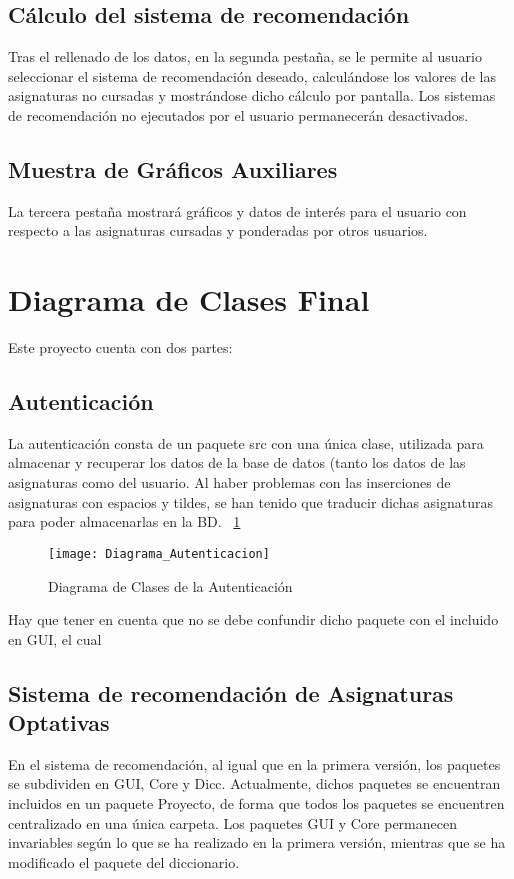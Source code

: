 \subsection{Cálculo del sistema de recomendación}
Tras el rellenado de los datos, en la segunda pestaña, se le permite al usuario seleccionar el sistema de recomendación deseado, calculándose los valores de las asignaturas no cursadas y mostrándose dicho cálculo por pantalla. Los sistemas de recomendación no ejecutados por el usuario permanecerán desactivados. 
\subsection{Muestra de Gráficos Auxiliares}
La tercera pestaña mostrará gráficos y datos de interés para el usuario con respecto a las asignaturas cursadas y ponderadas por otros usuarios. 


\section{Diagrama de Clases Final}
Este proyecto cuenta con dos partes: 
\subsection{Autenticación}
La autenticación consta de un paquete src con una única clase, utilizada para almacenar y recuperar los datos de la base de datos (tanto los datos de las asignaturas como del usuario. 
Al haber problemas con las inserciones de asignaturas con espacios y tildes, se han tenido que traducir dichas asignaturas para poder almacenarlas en la BD. ~\ref{fig:C.4.1}
\begin{figure}[h]
\centering
\texttt{[image: Diagrama\_Autenticacion]}
\caption{Diagrama de Clases de la Autenticación}
\label{fig:C.4.1}
\end{figure}
Hay que tener en cuenta que no se debe confundir dicho paquete con el incluido en GUI, el cual 

\subsection{Sistema de recomendación de Asignaturas Optativas}
En el sistema de recomendación, al igual que en la primera versión, los paquetes se subdividen en GUI,  Core y Dicc. Actualmente, dichos paquetes se encuentran incluidos en un paquete Proyecto, de forma que todos los paquetes se encuentren centralizado  en una única carpeta. Los paquetes GUI y Core permanecen invariables según lo que se ha realizado en la primera versión, mientras que se ha modificado el paquete del diccionario. 
